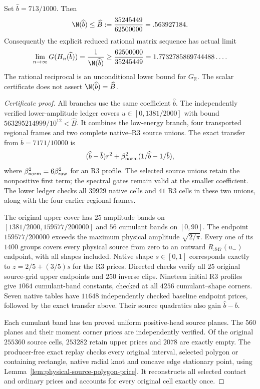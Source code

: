 \begin{theorem}
\label{thm:final-preferred-polygon}
Set $\widehat b=713/1000$. Then
\[
 \N(\widehat b)\le\widehat B:=\frac{35245449}{62500000}
 =.563927184.
\]
Consequently the explicit reduced rational matrix sequence has actual limit
\[
 \lim_{n\to\infty}G(H_n(\widehat b))
 =\frac1{\N(\widehat b)}
 \ge\frac{62500000}{35245449}
 =1.7732785869744488\ldots .
\]
The rational reciprocal is an unconditional lower bound for
$G_{\mathbb R}$. The scalar certificate does not assert
$\N(\widehat b)=\widehat B$.
\end{theorem}
\begin{proof}[Certificate proof]
All branches use the same coefficient $\widehat b$. The independently
verified lower-amplitude ledger covers $u\in[0,1381/2000]$ with bound
$563295214999/10^{12}<\widehat B$. It combines the low-energy branch,
four transported regional frames and two complete native--R3 source
unions. The exact transfer from $\bar b=7171/10000$ is
\[
 (\widehat b-\bar b)r^2+
 \beta_{\rm norm}^2(1/\widehat b-1/\bar b),
\]
where $\beta_{\rm norm}^2=6\beta_{\rm raw}^2$ for an R3 profile.
The selected source unions retain the nonpositive first term; the
spectral gates remain valid at the smaller coefficient. The lower
ledger checks all $39929$ native cells and $41$ R3 cells in these two
unions, along with the four earlier regional frames.

The original upper cover has $25$ amplitude bands on
$[1381/2000,159577/200000]$ and $56$ cumulant bands on $[0,90]$.
The endpoint $159577/200000$ exceeds the maximum physical amplitude
$\sqrt{2/\pi}$. Every one of its $1400$ groups covers every physical
source from zero to an outward $R_{.847}(u_-)$ endpoint, with all shapes
included. Native shape $s\in[0,1]$ corresponds exactly to
$z=2/5+(3/5)s$ for the R3 prices. Directed checks verify all $25$
original source-grid upper endpoints and $250$ inverse clips.
Nineteen initial R3 profiles give $1064$ cumulant-band constants,
checked at all $4256$ cumulant--shape corners. Seven native tables
have $11648$ independently checked baseline endpoint prices, followed
by the exact transfer above. Their source quadratics also gain
$\widehat b-\bar b$.

Each cumulant band has ten proved uniform positive-head source planes.
The $560$ planes and their moment corner prices are independently
verified. Of the original $255360$ source cells, $253282$ retain
upper prices and $2078$ are exactly empty. The producer-free exact
replay checks every original interval, selected polygon or containing
rectangle, native radial knot and concave edge stationary point, using
Lemma~\ref{lem:physical-source-polygon-price}. It reconstructs all
selected contact and ordinary prices and accounts for every original
cell exactly once.


\end{proof}
